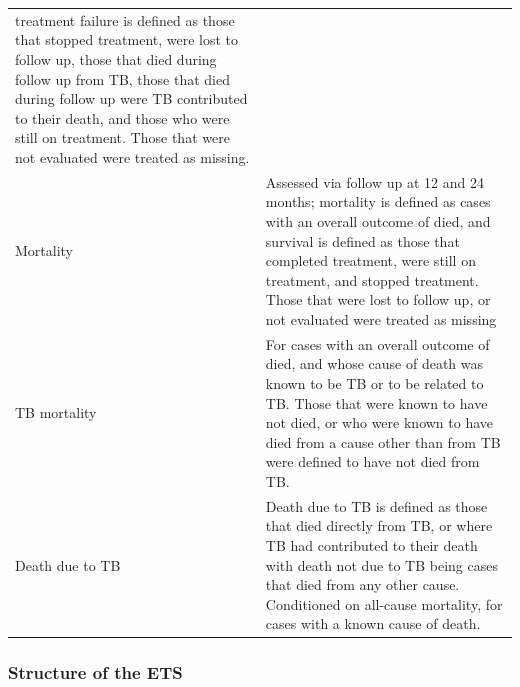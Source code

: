 \documentclass[11pt,twoside]{bristolthesis}
\begin{document}
\begin{longtable}[]{@{}ll@{}}
\begin{minipage}[t]{0.62\columnwidth}
  treatment failure is defined as those that stopped
  treatment, were lost to follow up, those that died
  during follow up from TB, those that died during
  follow up were TB contributed to their death, and
  those who were still on treatment. Those that were
  not evaluated were treated as missing.\strut
  \end{minipage}\tabularnewline
  \begin{minipage}[t]{0.33\columnwidth}\raggedright
  Mortality\strut
  \end{minipage} & \begin{minipage}[t]{0.62\columnwidth}\raggedright
  Assessed via follow up at 12 and 24 months;
  mortality is defined as cases with an overall
  outcome of died, and survival is defined as those
  that completed treatment, were still on treatment,
  and stopped treatment. Those that were lost to
  follow up, or not evaluated were treated as
  missing\strut
  \end{minipage}\tabularnewline
  \begin{minipage}[t]{0.33\columnwidth}\raggedright
  TB mortality\strut
  \end{minipage} & \begin{minipage}[t]{0.62\columnwidth}\raggedright
  For cases with an overall outcome of died, and
  whose cause of death was known to be TB or to be
  related to TB. Those that were known to have not
  died, or who were known to have died from a cause
  other than from TB were defined to have not died
  from TB.\strut
  \end{minipage}\tabularnewline
  \begin{minipage}[t]{0.33\columnwidth}\raggedright
  Death due to TB\strut
  \end{minipage} & \begin{minipage}[t]{0.62\columnwidth}\raggedright
  Death due to TB is defined as those that died
  directly from TB, or where TB had contributed to
  their death with death not due to TB being cases
  that died from any other cause. Conditioned on
  all-cause mortality, for cases with a known cause
  of death.\strut
  \end{minipage}\tabularnewline
  \bottomrule
  \end{longtable}
  \hypertarget{structure-of-the-ets}{%
  \subsubsection{Structure of the ETS}\label{structure-of-the-ets}}
  
\end{document}

